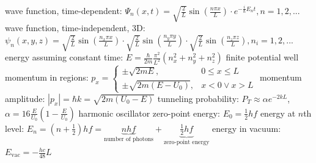 \documentclass[10pt,landscape]{article}
\newcommand{\spc}{\hspace*{1em}}
\begin{document}
\begin{multicols*}{3}
\spc wave function, time-dependent:
\newline
\spc \spc $\Psi_n(x,t)=\sqrt{\frac{2}{L}}\sin(\frac{n\pi x}{L})\cdot e^{-\frac{i}{\hbar}E_nt},n=1,2,...$
\newline \newline
\spc wave function, time-independent, 3D:
\newline
\spc \spc $\psi_n(x,y,z)=\sqrt{\frac{2}{L}}\sin(\frac{n_x\pi x}{L})\cdot \sqrt{\frac{2}{L}}\sin(\frac{n_y\pi y}{L})\cdot \sqrt{\frac{2}{L}}\sin(\frac{n_z\pi z}{L}),n_i=1,2,...$
\newline
\spc \spc energy assuming constant time: $E=\frac{\hbar}{2m}\frac{\pi^2}{L^2}(n_x^2+n_y^2+n_z^2)$
\newline \newline
finite potential well
\newline
\spc momentum in regions:
\newline
\spc \spc $p_x=\left\{\begin{matrix}
\pm \sqrt{2mE},&0\leq x\leq L\\ \pm \sqrt{2m(E-U_0)},&x<0\vee x>L 
\end{matrix}\right.$
\newline
\spc momentum amplitude: $|p_x|=\hbar k=\sqrt{2m(U_0-E)}$
\newline
\spc tunneling probability: $P_T\approx \alpha e^{-2kL}$,  $\alpha=16\frac{E}{U_0}(1-\frac{E}{U_0})$
\newline \newline
harmonic oscillator
\newline
\spc zero-point energy: $E_0=\frac{1}{2}hf$
\newline
\spc energy at $n$th level: \spc\spc$E_n=(n+\frac{1}{2})hf=\underbrace{nhf}_{\textrm{number of photons}}+\underbrace{\tfrac{1}{2}hf}_{\textrm{zero-point energy}}$
\newline
\spc energy in vacuum: $E_{\textrm{vac}}=-\frac{hc}{48}L$

\end{multicols*}
\end{document}
